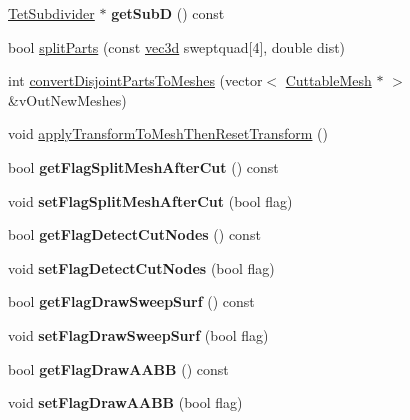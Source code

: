 \begin{DoxyCompactItemize}
\item 
\hypertarget{classps_1_1CuttableMesh_a602f7731e62546b6cd5a017908932c24}{}\hyperlink{classps_1_1elastic_1_1TetSubdivider}{Tet\+Subdivider} $\ast$ {\bfseries get\+Sub\+D} () const \label{classps_1_1CuttableMesh_a602f7731e62546b6cd5a017908932c24}

\item 
bool \hyperlink{classps_1_1CuttableMesh_acd91060a3627c4b737c720453fedf048}{split\+Parts} (const \hyperlink{classps_1_1base_1_1Vec3}{vec3d} sweptquad\mbox{[}4\mbox{]}, double dist)
\item 
int \hyperlink{classps_1_1CuttableMesh_ab4c5dbf71be7d1c5eefcdba554407f86}{convert\+Disjoint\+Parts\+To\+Meshes} (vector$<$ \hyperlink{classps_1_1CuttableMesh}{Cuttable\+Mesh} $\ast$ $>$ \&v\+Out\+New\+Meshes)
\item 
void \hyperlink{classps_1_1CuttableMesh_aea1783d6244415e4e017ba5e52e2f5a6}{apply\+Transform\+To\+Mesh\+Then\+Reset\+Transform} ()
\item 
\hypertarget{classps_1_1CuttableMesh_afed24c1acaf388922be83f172f8e48aa}{}bool {\bfseries get\+Flag\+Split\+Mesh\+After\+Cut} () const \label{classps_1_1CuttableMesh_afed24c1acaf388922be83f172f8e48aa}

\item 
\hypertarget{classps_1_1CuttableMesh_a7e1db77d6b343f5dc0f86c848f4e29ae}{}void {\bfseries set\+Flag\+Split\+Mesh\+After\+Cut} (bool flag)\label{classps_1_1CuttableMesh_a7e1db77d6b343f5dc0f86c848f4e29ae}

\item 
\hypertarget{classps_1_1CuttableMesh_a78b480e1d1e2de13bc8bdec7f71b0bd7}{}bool {\bfseries get\+Flag\+Detect\+Cut\+Nodes} () const \label{classps_1_1CuttableMesh_a78b480e1d1e2de13bc8bdec7f71b0bd7}

\item 
\hypertarget{classps_1_1CuttableMesh_a7bbaa6fa077d08cdd5319a7c93bb36b8}{}void {\bfseries set\+Flag\+Detect\+Cut\+Nodes} (bool flag)\label{classps_1_1CuttableMesh_a7bbaa6fa077d08cdd5319a7c93bb36b8}

\item 
\hypertarget{classps_1_1CuttableMesh_a44f67ac93471e5521fd2b7cc5d39ad19}{}bool {\bfseries get\+Flag\+Draw\+Sweep\+Surf} () const \label{classps_1_1CuttableMesh_a44f67ac93471e5521fd2b7cc5d39ad19}

\item 
\hypertarget{classps_1_1CuttableMesh_ac0b41a7285b699f01c5d612f2396f3f5}{}void {\bfseries set\+Flag\+Draw\+Sweep\+Surf} (bool flag)\label{classps_1_1CuttableMesh_ac0b41a7285b699f01c5d612f2396f3f5}

\item 
\hypertarget{classps_1_1CuttableMesh_a6f002ac4fc3df84628a1d047a21c31e9}{}bool {\bfseries get\+Flag\+Draw\+A\+A\+B\+B} () const \label{classps_1_1CuttableMesh_a6f002ac4fc3df84628a1d047a21c31e9}

\item 
\hypertarget{classps_1_1CuttableMesh_aef9e81db1058ec6529d0b123b2fe88c6}{}void {\bfseries set\+Flag\+Draw\+A\+A\+B\+B} (bool flag)\label{classps_1_1CuttableMesh_aef9e81db1058ec6529d0b123b2fe88c6}

\end{DoxyCompactItemize}
